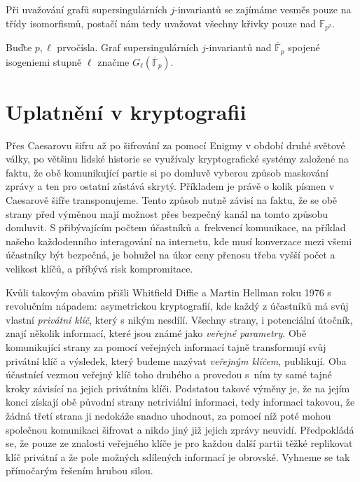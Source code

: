 \documentclass[12pt]{report}
\begin{document}
Při uvažování grafů supersingulárních $j$-invariantů se zajímáme vesměs pouze na třídy isomorfismů, postačí nám tedy uvažovat všechny křivky pouze nad $\mathbb{F}_{p^2}$.

\begin{znaceni}
Buďte $p, \ell$ prvočísla. Graf supersingulárních $j$-invariantů nad $\overline{\mathbb{F}}_p$ spojené isogeniemi stupně $\ell$ značme $G_{\ell} (\overline{\mathbb{F}}_p)$.
\end{znaceni}


\chapter{Uplatnění v kryptografii}

Přes Caesarovu šifru až po šifrování za pomocí Enigmy v období druhé světové války, po většinu lidské historie se využívaly kryptografické systémy založené na faktu, že obě komunikující partie si po domluvě vyberou způsob maskování zprávy a ten pro ostatní zůstává skrytý. Příkladem je právě o kolik písmen v Caesarově šifře transponujeme. Tento způsob nutně závisí na faktu, že se obě strany před výměnou mají možnost přes bezpečný kanál na tomto způsobu domluvit. S přibývajícím počtem účastníků a~frekvencí komunikace, na příklad našeho každodenního interagování na internetu, kde musí konverzace mezi všemi účastníky být bezpečná, je bohužel na úkor ceny přenosu třeba vyšší počet a velikost klíčů, a příbývá risk kompromitace.

Kvůli takovým obavám přišli Whitfield Diffie a Martin Hellman \cite{Diffie} roku 1976 s revolučním nápadem: asymetrickou kryptografií, kde každý z účastníků má svůj vlastní \textit{privátní klíč}, který s nikým nesdílí. Všechny strany, i potenciální útočník, znají několik informací, které jsou známé jako \textit{veřejné parametry}. Obě komunikující strany za pomocí veřejných informací tajně transformují svůj privátní klíč a výsledek, který budeme nazývat \textit{veřejným klíčem}, publikují. Oba účastnící vezmou veřejný klíč toho druhého a provedou s~ním ty samé tajné kroky závisící na jejich privátním klíči. Podstatou takové výměny je, že na jejím konci získají obě původní strany netriviální informaci, tedy informaci takovou, že žádná třetí strana ji nedokáže snadno uhodnout, za pomocí níž poté mohou společnou komunikaci šifrovat a nikdo jiný již jejich zprávy neuvidí. Předpokládá se, že pouze ze znalosti veřejného klíče je pro každou další partii těžké replikovat klíč privátní a že pole možných sdílených informací je obrovské. Vyhneme se tak přímočarým řešením hrubou silou.
\end{document}
